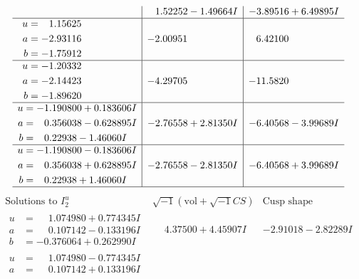 \documentclass[1p]{elsarticle_modified}
\theoremstyle{definition}
\newcommand{\I}{\sqrt{-1}}
\begin{document}
$$\begin{array}{c|c|c}
 & \phantom{-}1.52252 - 1.49664 I & -3.89516 + 6.49895 I \\ \hline\begin{aligned}
u &= \phantom{-}1.15625\phantom{ +0.000000I} \\
a &= -2.93116\phantom{ +0.000000I} \\
b &= -1.75912\phantom{ +0.000000I}\end{aligned}
 & -2.00951\phantom{ +0.000000I} & \phantom{-}6.42100\phantom{ +0.000000I} \\ \hline\begin{aligned}
u &= -1.20332\phantom{ +0.000000I} \\
a &= -2.14423\phantom{ +0.000000I} \\
b &= -1.89620\phantom{ +0.000000I}\end{aligned}
 & -4.29705\phantom{ +0.000000I} & -11.5820\phantom{ +0.000000I} \\ \hline\begin{aligned}
u &= -1.190800 + 0.183606 I \\
a &= \phantom{-}0.356038 - 0.628895 I \\
b &= \phantom{-}0.22938 - 1.46060 I\end{aligned}
 & -2.76558 + 2.81350 I & -6.40568 - 3.99689 I \\ \hline\begin{aligned}
u &= -1.190800 - 0.183606 I \\
a &= \phantom{-}0.356038 + 0.628895 I \\
b &= \phantom{-}0.22938 + 1.46060 I\end{aligned}
 & -2.76558 - 2.81350 I & -6.40568 + 3.99689 I\\
 \hline 
 \end{array}$$\newpage$$\begin{array}{c|c|c}  
\text{Solutions to }I^u_{2}& \I (\text{vol} + \sqrt{-1}CS) & \text{Cusp shape}\\
 \hline 
\begin{aligned}
u &= \phantom{-}1.074980 + 0.774345 I \\
a &= \phantom{-}0.107142 - 0.133196 I \\
b &= -0.376064 + 0.262990 I\end{aligned}
 & \phantom{-}4.37500 + 4.45907 I & -2.91018 - 2.82289 I \\ \hline\begin{aligned}
u &= \phantom{-}1.074980 - 0.774345 I \\
a &= \phantom{-}0.107142 + 0.133196 I \\

\end{aligned}
\end{array}$$
\end{document}
